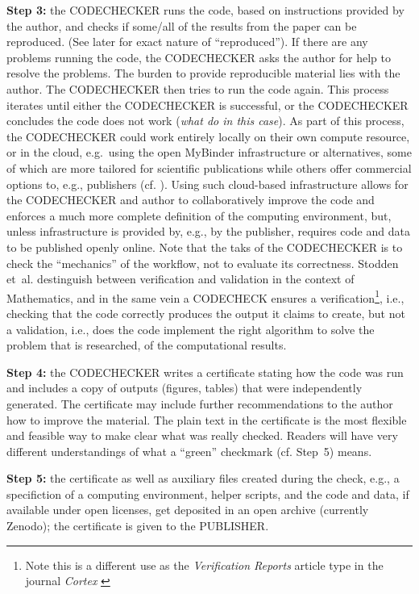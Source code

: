 \documentclass[12pt]{article}
\begin{document}
\textbf{Step 3:} the CODECHECKER runs the code, based on instructions provided by
the author, and checks if some/all of the results from the paper can be
reproduced. (See later for exact nature of ``reproduced''). If there are
any problems running the code, the CODECHECKER asks the author for help
to resolve the problems. The burden to provide reproducible material lies with
the author.
The CODECHECKER then tries to run the code again.
This process iterates until either the CODECHECKER is successful,
or the CODECHECKER concludes the code does not work (\emph{what do in this
case}). As part of this process, the CODECHECKER could work entirely
locally on their own compute resource, or in the cloud, e.g.~using the open
MyBinder infrastructure \cite{jupyter_binder_2018} or alternatives, some of which
are more tailored for scientific publications while others offer commercial
options to, e.g., publishers (cf. \cite{konkol_publishing_2020}).
Using such cloud-based 
infrastructure allows for the CODECHECKER and author to collaboratively improve
the code and enforces a much more complete definition of the computing environment,
but, unless infrastructure is provided by, e.g., by the publisher, requires code
and data to be published openly online.
Note that the taks of the CODECHECKER is to check the ``mechanics'' of the
workflow, not to evaluate its correctness. 
Stodden et~al. \cite{stodden_setting_2013} destinguish between verification and
validation in the context of Mathematics, and in the same vein a CODECHECK
ensures a verification\footnote{Note this is a different use as the \emph{Verification Reports} article type in the journal \emph{Cortex}
\cite{chambers_verification_2020}},
i.e., checking that the code correctly produces the 
output it claims to create, but not a validation, i.e., does the code implement
the right algorithm to solve the problem that is researched, 
of the computational results.

\textbf{Step 4:} the CODECHECKER writes a certificate stating how the code was
run and includes a copy of outputs (figures, tables) that were
independently generated. The certificate may include further recommendations to
the author how to improve the material.
The plain text in the certificate is the most flexible and feasible way to 
make clear what was really checked. Readers will have very different 
understandings of what a ``green'' checkmark (cf. Step~5) means.

\textbf{Step 5:} the certificate as well as auxiliary files created during the check,
e.g., a specifiction of a computing environment, helper scripts, and the code and data,
if available under open licenses, get deposited in an open archive (currently Zenodo);
the certificate is given to the PUBLISHER.
\end{document}
